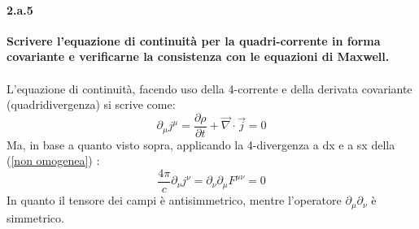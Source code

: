 \documentclass[twoside]{article}
\begin{document}
\paragraph{2.a.5}\textbf{Scrivere l'equazione di continuità per la quadri-corrente in forma covariante e
verificarne la consistenza con le equazioni di Maxwell.}\\ \\
L'equazione di continuità, facendo uso della 4-corrente e della derivata covariante (quadridivergenza) si scrive come:
\begin{equation}
    \partial_{\mu}j^{\mu}=\frac{\partial \rho}{\partial t}+\vec{\nabla}\cdot \vec{j}=0
\end{equation}
Ma, in base a quanto visto sopra, applicando la 4-divergenza a dx e a sx della (\ref{non omogenea}) :
\begin{equation}
    \frac{4\pi}{c}\partial_{\nu}j^{\nu}=\partial_{\nu}\partial_{\mu}F^{\mu \nu}=0
\end{equation}
In quanto il tensore dei campi è antisimmetrico, mentre l'operatore $\partial_{\mu}\partial_{\nu}$ è simmetrico.
\end{document}
